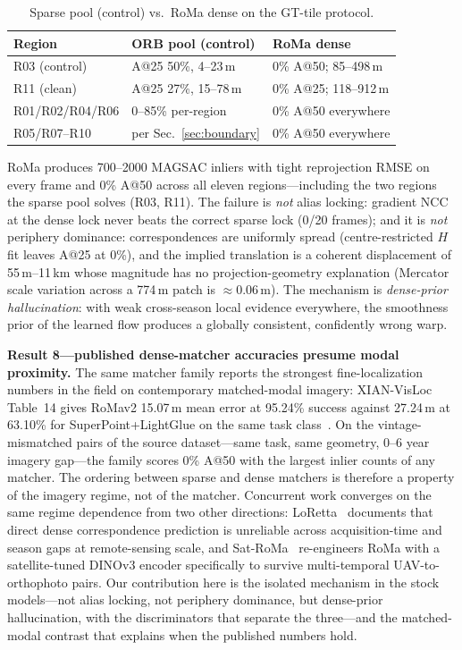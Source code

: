 \documentclass[journal]{IEEEtran}
\begin{document}
\begin{table}[t]
\caption{Sparse pool (control) vs.\ RoMa dense on the GT-tile protocol.}
\label{tab:dense}
\centering
\footnotesize
\begin{tabular}{@{}lll@{}}
\toprule
Region & ORB pool (control) & RoMa dense \\
\midrule
R03 (control) & A@25 50\%, 4--23\,m & 0\% A@50; 85--498\,m \\
R11 (clean) & A@25 27\%, 15--78\,m & 0\% A@25; 118--912\,m \\
R01/R02/R04/R06 & 0--85\% per-region & 0\% A@50 everywhere \\
R05/R07--R10 & per Sec.~\ref{sec:boundary} & 0\% A@50 everywhere \\
\bottomrule
\end{tabular}
\end{table}

RoMa produces 700--2000 MAGSAC inliers with tight reprojection RMSE on every frame and 0\% A@50 across all eleven regions---including the two regions the sparse pool solves (R03, R11). The failure is \emph{not} alias locking: gradient NCC at the dense lock never beats the correct sparse lock (0/20 frames); and it is \emph{not} periphery dominance: correspondences are uniformly spread (centre-restricted $H$ fit leaves A@25 at 0\%), and the implied translation is a coherent displacement of 55\,m--11\,km whose magnitude has no projection-geometry explanation (Mercator scale variation across a 774\,m patch is $\approx$0.06\,m). The mechanism is \emph{dense-prior hallucination}: with weak cross-season local evidence everywhere, the smoothness prior of the learned flow produces a globally consistent, confidently wrong warp.

\textbf{Result 8---published dense-matcher accuracies presume modal proximity.} The same matcher family reports the strongest fine-localization numbers in the field on contemporary matched-modal imagery: XIAN-VisLoc Table~14 gives RoMav2 15.07\,m mean error at 95.24\% success against 27.24\,m at 63.10\% for SuperPoint+LightGlue on the same task class~\cite{xianvisloc}. On the vintage-mismatched pairs of the source dataset---same task, same geometry, 0--6 year imagery gap---the family scores 0\% A@50 with the largest inlier counts of any matcher. The ordering between sparse and dense matchers is therefore a property of the imagery regime, not of the matcher. Concurrent work converges on the same regime dependence from two other directions: LoRetta~\cite{loretta} documents that direct dense correspondence prediction is unreliable across acquisition-time and season gaps at remote-sensing scale, and Sat-RoMa~\cite{satroma} re-engineers RoMa with a satellite-tuned DINOv3 encoder specifically to survive multi-temporal UAV-to-orthophoto pairs. Our contribution here is the isolated mechanism in the stock models---not alias locking, not periphery dominance, but dense-prior hallucination, with the discriminators that separate the three---and the matched-modal contrast that explains when the published numbers hold.
\end{document}
